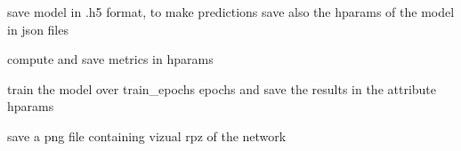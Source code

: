 \documentclass[letterpaper,10pt,english]{sphinxmanual}
\begin{document}
\begin{fulllineitems}

\begin{fulllineitems}
\label{\detokenize{CHF_model_api:CHF_model_api.model.MyModel.save}}
\pysigstartsignatures
{}
\pysigstopsignatures
\sphinxAtStartPar
save model in .h5 format, to make predictions
save also the hparams of the model in json files

\end{fulllineitems}


\begin{fulllineitems}
\label{\detokenize{CHF_model_api:CHF_model_api.model.MyModel.saveResults}}
\pysigstartsignatures
{}
\pysigstopsignatures
\sphinxAtStartPar
compute and save metrics in hparams

\end{fulllineitems}


\begin{fulllineitems}
\label{\detokenize{CHF_model_api:CHF_model_api.model.MyModel.train}}
\pysigstartsignatures
{}
\pysigstopsignatures
\sphinxAtStartPar
train the model over train\_epochs epochs and save
the results in the attribute hparams

\end{fulllineitems}


\begin{fulllineitems}
\label{\detokenize{CHF_model_api:CHF_model_api.model.MyModel.vizualize}}
\pysigstartsignatures
{}
\pysigstopsignatures
\sphinxAtStartPar
save a png file containing vizual rpz of the network

\end{fulllineitems}


\end{fulllineitems}
\end{document}
